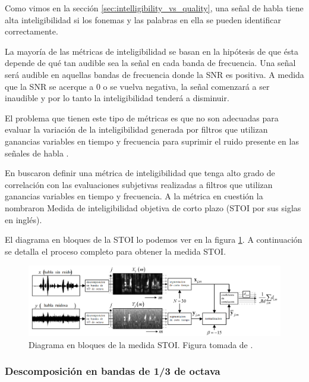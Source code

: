 Como vimos en la sección \ref{sec:intelligibility_vs_quality}, una señal de habla tiene alta inteligibilidad si los fonemas y las palabras en ella se pueden identificar correctamente.

La mayoría de las métricas de inteligibilidad se basan en la hipótesis de que ésta depende de qué tan audible sea la señal en cada banda de frecuencia. Una señal será audible en aquellas bandas de frecuencia donde la SNR es positiva. A medida que la SNR se acerque a 0 o se vuelva negativa, la señal comenzará a ser inaudible y por lo tanto la inteligibilidad tenderá a disminuir.  

El problema que tienen este tipo de métricas es que no son adecuadas para evaluar la variación de la inteligibilidad generada por filtros que utilizan ganancias variables en tiempo y frecuencia para suprimir el ruido presente en las señales de habla \cite{an_algorithm_for_intelligibility_prediction_of_time_frequency_weighted_noisy_speech}. 

En \cite{an_algorithm_for_intelligibility_prediction_of_time_frequency_weighted_noisy_speech} buscaron definir una métrica de inteligibilidad que tenga alto grado de correlación con las evaluaciones subjetivas realizadas a filtros que utilizan ganancias variables en tiempo y frecuencia. A la métrica en cuestión la nombraron Medida de inteligibilidad objetiva de corto plazo (STOI por sus siglas en inglés).

El diagrama en bloques de la STOI lo podemos ver en la figura \ref{fig:ch4_stoi_schematic}. A continuación se detalla el proceso completo para obtener la medida STOI.

\begin{figure}
	\centering
	\centerline{\includegraphics[scale=0.4]{images/ch4/stoi_schematic.png}}
	\caption{Diagrama en bloques de la medida STOI. Figura tomada de \cite{an_algorithm_for_intelligibility_prediction_of_time_frequency_weighted_noisy_speech}.}
	\label{fig:ch4_stoi_schematic}
\end{figure}

\subsubsection{Descomposición en bandas de 1/3 de octava}

